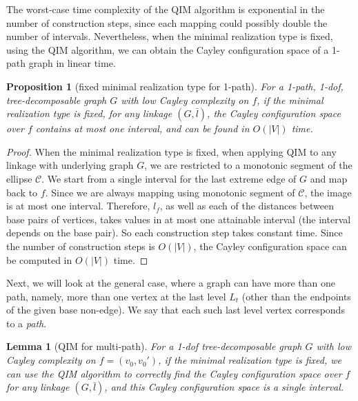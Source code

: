 \documentclass[secthm,amsthm,english]{article}
\newtheorem{lemma}{Lemma}
\newtheorem{proposition}{Proposition}
\theoremstyle{definition}
\theoremstyle{remark}
\begin{document}
The worst-case time complexity of the QIM algorithm is exponential in the number of construction steps, since each mapping could possibly double the number of intervals. 
Nevertheless, when the minimal realization type is fixed, using the QIM algorithm, we can obtain the Cayley configuration space of a 1-path graph in linear time. 

\begin{proposition}[fixed minimal realization type for 1-path]\label{obs:1-path}
For a 1-path, 1-dof, tree-decomposable graph $G$
with low Cayley complexity on $f$, if the minimal realization type is fixed, 
for any linkage $(G, \bar{l})$, 
the Cayley configuration space over $f$ contains at most one interval, and can be found in $O(|V|)$ time. 
\end{proposition}

\begin{proof}
When the minimal realization type is fixed, 
when applying QIM to any linkage with underlying graph $G$, 
we are restricted to a monotonic segment of the ellipse $\mathcal{C}$. We start from a single interval for the last extreme edge of $G$ and map back to $f$. 
Since we are always mapping using monotonic segment  of $\mathcal{C}$, the image is at most one interval. 
Therefore, $l_f$, as well as each of the distances between base pairs of vertices, 
takes values in at most one attainable interval (the interval depends on the base pair). 
So each construction step takes constant time.  
Since the number of construction steps is $O(|V|)$, the Cayley configuration space can be computed in $O(|V|)$ time. 
\end{proof}










\noindent Next, we will look at the general case, 
where a graph can have more than one path, namely, 
more than one vertex at the last level $L_t$ (other than the endpoints of the given base non-edge). 
We say that each such last level vertex corresponds to a \emph{path}. 




\begin{lemma}[QIM for multi-path] \label{lem: QIM-k-path}
For a 1-dof tree-decomposable graph $G$ with low Cayley complexity on $f=(v_0,v_0')$, 
if the minimal realization type is fixed, 
we can use the QIM algorithm to correctly find the Cayley configuration space over $f$ for any linkage $(G, \bar{l})$,  
and this Cayley configuration space is a single interval.  
\end{lemma}
\end{document}
